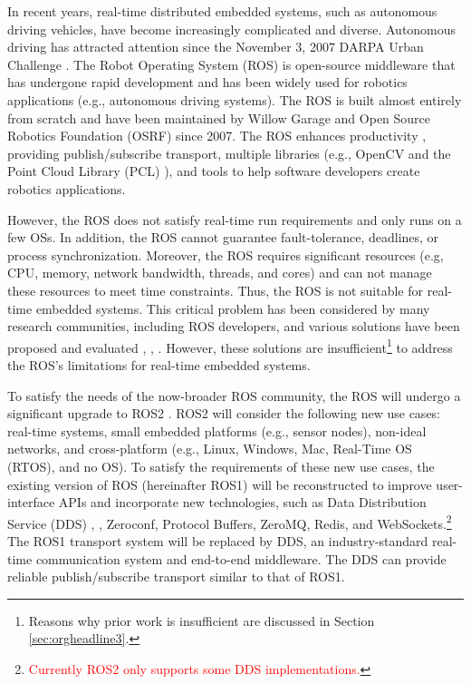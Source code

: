 \documentclass{sig-alternate-05-2015}
\begin{document}
In recent years, real-time distributed embedded systems, such as autonomous driving vehicles, have become increasingly complicated and diverse.
Autonomous driving has attracted attention since the November 3, 2007 DARPA Urban Challenge \cite{urmson2008autonomous}.
The Robot Operating System (ROS) \cite{quigley2009ros} is open-source middleware that has undergone rapid development \cite{cousins2011exponential} and has been widely used for robotics applications (e.g., autonomous driving systems).
The ROS is built almost entirely from scratch and have been maintained by Willow Garage \cite{willowgarage} and Open Source Robotics Foundation (OSRF) \cite{osrf} since 2007. 
The ROS enhances productivity \cite{cousins2010sharing}, providing publish/subscribe transport, multiple libraries (e.g., OpenCV and the Point Cloud Library (PCL) \cite{pcl}), and tools to help software developers create robotics applications.

However, the ROS does not satisfy real-time run requirements and only runs on a few OSs. 
In addition, the ROS cannot guarantee fault-tolerance, deadlines, or process synchronization.
Moreover, the ROS requires significant resources (e.g, CPU, memory, network bandwidth, threads, and cores) and can not manage these resources to meet time constraints.
Thus, the ROS is not suitable for real-time embedded systems. 
This critical problem has been considered by many research communities, including ROS developers, and various solutions have been proposed and evaluated \cite{rosc@roscon2013}, \cite{uros@roscon2013}, \cite{wei2015rt}.
However, these solutions are insufficient\footnote{Reasons why prior work is insufficient are discussed in Section \ref{sec:orgheadline3}.}  to address the ROS's limitations for real-time embedded systems. 

To satisfy the needs of the now-broader ROS community, the ROS will undergo a significant upgrade to ROS2 \cite{ros2_iccps2016}. 
ROS2 will consider the following new use cases: real-time systems, small embedded platforms (e.g., sensor nodes), non-ideal networks, and cross-platform (e.g., Linux, Windows, Mac, Real-Time OS (RTOS), and no OS).
To satisfy the requirements of these new use cases, the existing version of ROS (hereinafter ROS1) will be reconstructed to improve user-interface APIs and incorporate new technologies, such as Data Distribution Service (DDS) \cite{pardo2003omg}, \cite{schlesselman2004omg}, Zeroconf, Protocol Buffers, ZeroMQ, Redis, and WebSockets.\footnote{\textcolor{red}{Currently ROS2 only supports some DDS implementations.}}
The ROS1 transport system will be replaced by DDS, an industry-standard real-time communication system and end-to-end middleware. 
The DDS can provide reliable publish/subscribe transport similar to that of ROS1.
\end{document}
